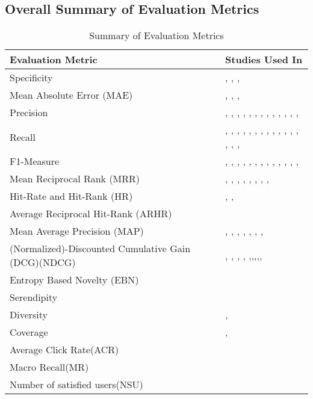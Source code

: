 \subsection{Overall Summary of Evaluation Metrics}
\begin{table}[!htbp] 
\centering
\footnotesize
\def\arraystretch{1.4}%
\centering
\begin{tabular}{|p{2cm}|p{9cm}|}
\hline
\textbf{Evaluation Metric} & \textbf{Studies Used In}
\\
\hline
Specificity& \cite{SF-IDF}, \cite{SF-IDF+}, \cite{bingSF-IDF+},
\\
\hline
Mean Absolute Error (MAE) & \cite{N4}, \cite{p3-1}, \cite{N4}, 
\\
\hline 
Precision & \cite{p4-7}, \cite{p4-6}, \cite{49Ahn}, \cite{N9}, \cite{N26}, \cite{N2}, \cite{N13}, \cite{N21}, \cite{N66}, \cite{N67}, \cite{N51}, \cite{p4-1}, \cite{p4-5}, \cite{N71}
\\
\hline 
Recall & \cite{49Ahn}, \cite{CF-IDF}, \cite{CF-IDF+}, \cite{N26}, \cite{N2}, \cite{N13}, \cite{N15}, \cite{N21}, \cite{N14}, \cite{N66}, \cite{N59}, \cite{N51}, \cite{p4-1}, \cite{p4-5}, \cite{p4-6}, \cite{p4-7}, 
\\
\hline
F1-Measure & \cite{SF-IDF}, \cite{CF-IDF}, \cite{CF-IDF+}, \cite{SF-IDF+}, \cite{bingSF-IDF+}, \cite{Bing-CF-IDF+}, \cite{N28}, \cite{N5}, \cite{N1}, \cite{N1}, \cite{N3}, \cite{p6-1}, \cite{p4-6}, \cite{p4-7}
\\
\hline
Mean Reciprocal Rank (MRR) & \cite{N1}, \cite{N24}, \cite{N11}, \cite{N17}, \cite{N33}, \cite{N19}, \cite{N20}, \cite{p4-2}, \cite{N62}
\\
\hline
Hit-Rate and Hit-Rank (HR) & \cite{N24}, \cite{p6-5}, \cite{N71}
\\
\hline
Average Reciprocal Hit-Rank (ARHR) & \cite{N65}
\\
\hline
Mean Average Precision (MAP) & \cite{N60}, \cite{N14}, \cite{p6-4}, \cite{p4-2}, \cite{N50}, \cite{N64}, \cite{N62}, \cite{N65}
\\
\hline
(Normalized)-Discounted Cumulative Gain (DCG)(NDCG) & \cite{N11}, \cite{N67}, \cite{N33}, \cite{N18}, \cite{p6-4},\cite{N63},\cite{N50},\cite{N2},\cite{N13}, \cite{N71}
\\
\hline
Entropy Based Novelty (EBN) & \cite{N13}
\\
\hline
Serendipity & \cite{N70}
\\
\hline
Diversity & \cite{N13}, \cite{N70}
\\ 
\hline
Coverage & \cite{N10}, \cite{N71}
\\ 
\hline
Average Click Rate(ACR) & \cite{p6-3}
\\ 
\hline
Macro Recall(MR) & \cite{p6-3}
\\ 
\hline
Number of satisfied users(NSU) & \cite{p6-3}
\end{tabular}

\caption{Summary of Evaluation Metrics}
\label{table:20}
\end{table}
\\